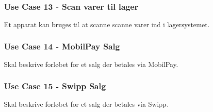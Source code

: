 

\subsubsection*{Use Case 13 - Scan varer til lager}
Et apparat kan bruges til at scanne scanne varer ind i lagersystemet. 

\subsubsection*{Use Case 14 - MobilPay Salg}
Skal beskrive forløbet for et salg der betales via MobilPay.

\subsubsection*{Use Case 15 - Swipp Salg}
Skal beskrive forløbet for et salg der betales via Swipp.
